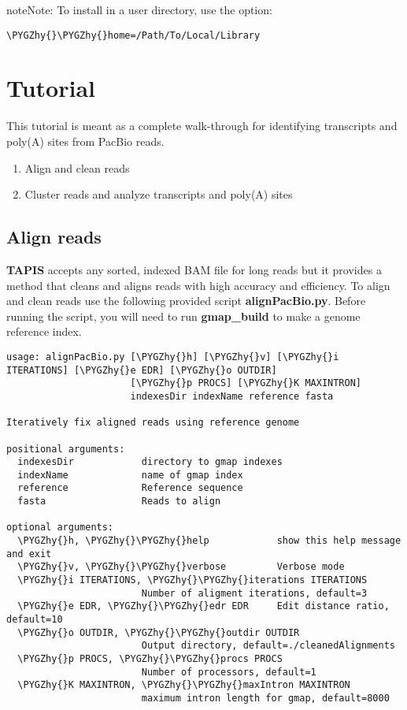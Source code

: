 \documentclass[letterpaper,10pt,english]{sphinxmanual}
\def\PYGZhy{\char`\-}
\begin{document}
\begin{notice}{note}{Note:}
To install in a user directory, use the option:

\begin{Verbatim}[commandchars=\\\{\}]
\PYGZhy{}\PYGZhy{}home=/Path/To/Local/Library
\end{Verbatim}
\end{notice}


\chapter{Tutorial}
\label{tutorial::doc}\label{tutorial:tutorial}\label{tutorial:gmap}
This tutorial is meant as a complete walk-through for identifying
transcripts and poly(A) sites from PacBio reads.
\begin{enumerate}
\item {} 
Align and clean reads

\item {} 
Cluster reads and analyze transcripts and poly(A) sites

\end{enumerate}


\section{Align reads}
\label{tutorial:align-reads}
\textbf{TAPIS} accepts any sorted, indexed BAM file for
long reads but it provides a method that cleans and aligns
reads with high accuracy and efficiency. To align and clean reads
use the following provided script \textbf{alignPacBio.py}.  Before
running the script, you will need to run \textbf{gmap\_build} to
make a genome reference index.

\begin{Verbatim}[commandchars=\\\{\}]
usage: alignPacBio.py [\PYGZhy{}h] [\PYGZhy{}v] [\PYGZhy{}i ITERATIONS] [\PYGZhy{}e EDR] [\PYGZhy{}o OUTDIR]
                      [\PYGZhy{}p PROCS] [\PYGZhy{}K MAXINTRON]
                      indexesDir indexName reference fasta

Iteratively fix aligned reads using reference genome

positional arguments:
  indexesDir            directory to gmap indexes
  indexName             name of gmap index
  reference             Reference sequence
  fasta                 Reads to align

optional arguments:
  \PYGZhy{}h, \PYGZhy{}\PYGZhy{}help            show this help message and exit
  \PYGZhy{}v, \PYGZhy{}\PYGZhy{}verbose         Verbose mode
  \PYGZhy{}i ITERATIONS, \PYGZhy{}\PYGZhy{}iterations ITERATIONS
                        Number of aligment iterations, default=3
  \PYGZhy{}e EDR, \PYGZhy{}\PYGZhy{}edr EDR     Edit distance ratio, default=10
  \PYGZhy{}o OUTDIR, \PYGZhy{}\PYGZhy{}outdir OUTDIR
                        Output directory, default=./cleanedAlignments
  \PYGZhy{}p PROCS, \PYGZhy{}\PYGZhy{}procs PROCS
                        Number of processors, default=1
  \PYGZhy{}K MAXINTRON, \PYGZhy{}\PYGZhy{}maxIntron MAXINTRON
                        maximum intron length for gmap, default=8000
\end{Verbatim}
\end{document}

